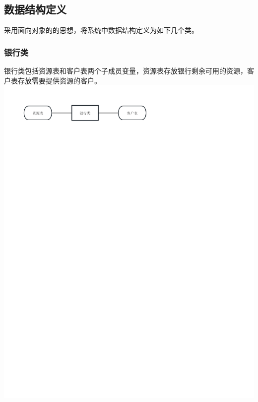 \documentclass{article}
\begin{document}
	\subsection{数据结构定义}
			采用面向对象的的思想，将系统中数据结构定义为如下几个类。
			\subsubsection{银行类}
			银行类包括资源表和客户表两个子成员变量，资源表存放银行剩余可用的资源，客户表存放需要提供资源的客户。
				~\\
				{\centering
					\includegraphics[align=c,width=\textwidth]{数据结构_银行类.pdf}
				}
\end{document}
